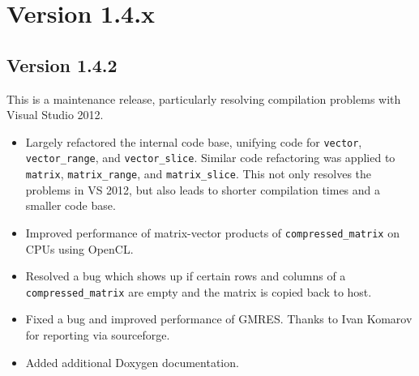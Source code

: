 \section*{Version 1.4.x}

\subsection*{Version 1.4.2}
This is a maintenance release, particularly resolving compilation problems with Visual Studio 2012.
\begin{itemize}
 \item Largely refactored the internal code base, unifying code for \lstinline|vector|, \lstinline|vector_range|, and \lstinline|vector_slice|.
       Similar code refactoring was applied to \lstinline|matrix|, \lstinline|matrix_range|, and \lstinline|matrix_slice|.
       This not only resolves the problems in VS 2012, but also leads to shorter compilation times and a smaller code base.
 \item Improved performance of matrix-vector products of \lstinline|compressed_matrix| on CPUs using OpenCL.
 \item Resolved a bug which shows up if certain rows and columns of a \lstinline|compressed_matrix| are empty and the matrix is copied back to host.
 \item Fixed a bug and improved performance of GMRES. Thanks to Ivan Komarov for reporting via sourceforge.
 \item Added additional Doxygen documentation.
\end{itemize}


